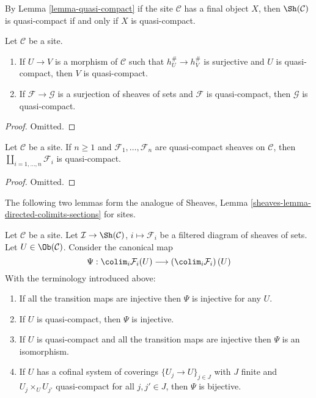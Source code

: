 \noindent
By Lemma \ref{lemma-quasi-compact}
if the site $\mathcal{C}$ has a final object $X$, then
$\Sh(\mathcal{C})$ is quasi-compact if and only if $X$ is quasi-compact.

\begin{lemma}
\label{lemma-image-of-quasi-compact}
Let $\mathcal{C}$ be a site.
\begin{enumerate}
\item If $U \to V$ is a morphism of $\mathcal{C}$ such that
$h_U^\# \to h_V^\#$ is surjective and $U$ is quasi-compact, then
$V$ is quasi-compact.
\item If $\mathcal{F} \to \mathcal{G}$ is a surjection of sheaves
of sets and $\mathcal{F}$ is quasi-compact, then $\mathcal{G}$
is quasi-compact.
\end{enumerate}
\end{lemma}

\begin{proof}
Omitted.
\end{proof}

\begin{lemma}
\label{lemma-coproduct-quasi-compact}
Let $\mathcal{C}$ be a site. If $n \geq 1$ and
$\mathcal{F}_1, \ldots, \mathcal{F}_n$ are quasi-compact
sheaves on $\mathcal{C}$, then $\coprod_{i = 1, \ldots, n} \mathcal{F}_i$
is quasi-compact.
\end{lemma}

\begin{proof}
Omitted.
\end{proof}

\noindent
The following two lemmas form the analogue of
Sheaves, Lemma \ref{sheaves-lemma-directed-colimits-sections}
for sites.

\begin{lemma}
\label{lemma-directed-colimits-sections}
Let $\mathcal{C}$ be a site. Let
$\mathcal{I} \to \Sh(\mathcal{C})$, $i \mapsto \mathcal{F}_i$
be a filtered diagram of sheaves of sets.
Let $U \in \Ob(\mathcal{C})$.
Consider the canonical map
$$
\Psi :
\colim_i \mathcal{F}_i(U)
\longrightarrow
\left(\colim_i \mathcal{F}_i\right)(U)
$$
With the terminology introduced above:
\begin{enumerate}
\item If all the transition maps are injective then
$\Psi$ is injective for any $U$.
\item If $U$ is quasi-compact, then $\Psi$ is injective.
\item If $U$ is quasi-compact and all the transition maps are injective
then $\Psi$ is an isomorphism.
\item If $U$ has a cofinal system of coverings
$\{U_j \to U\}_{j \in J}$ with
$J$ finite and $U_j \times_U U_{j'}$ quasi-compact
for all $j, j' \in J$, then $\Psi$ is bijective.
\end{enumerate}
\end{lemma}

